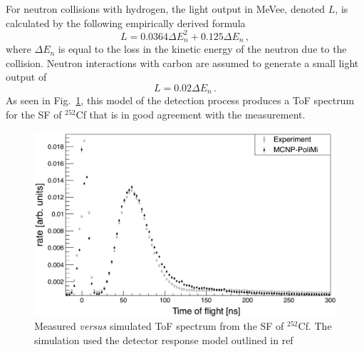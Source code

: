 For neutron collisions with hydrogen, the light output in MeVee, denoted $L$, is calculated by the following empirically derived formula
\begin{displaymath}
L = 0.0364 \Delta E_n^2 +  0.125 \Delta E_n \, ,
\end{displaymath}
where $\Delta E_n$ is equal to the loss in the kinetic energy of the neutron due to the collision.
Neutron interactions with carbon are assumed to generate a small light output of
\begin{displaymath}
L = 0.02 \Delta E_n \, .
\end{displaymath}
As seen in Fig.~\ref{fig:Cf252MCNPVsEXP}, this model of the detection process produces a ToF spectrum for the SF of $^{252}$Cf that is in good agreement with the measurement.
\begin{figure}
    \centering
    \includegraphics[width = \figsize\textwidth]{Cf252MCNPVsEXP.png}
    \caption{Measured \emph{versus} simulated ToF spectrum from the SF of $^{252}$Cf.
        The simulation used the detector response model outlined in ref~\cite{MPPost}}
    \label{fig:Cf252MCNPVsEXP}
\end{figure}

